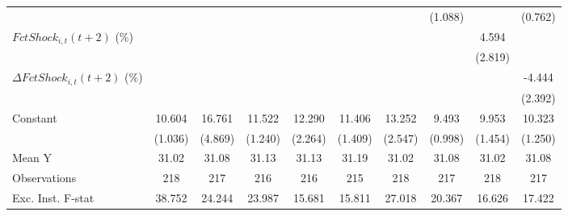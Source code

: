 {\begin{tabular}{l*{9}{c}}
                    &                     &                     &                     &                     &                     &                     &     (1.088)         &                     &     (0.762)         \\
\addlinespace
$ FctShock_{i,t}(t+2)$ (\%)&                     &                     &                     &                     &                     &                     &                     &       4.594         &                     \\
                    &                     &                     &                     &                     &                     &                     &                     &     (2.819)         &                     \\
\addlinespace
$ \Delta FctShock_{i,t}(t+2)$ (\%)&                     &                     &                     &                     &                     &                     &                     &                     &      -4.444\sym{*}  \\
                    &                     &                     &                     &                     &                     &                     &                     &                     &     (2.392)         \\
\addlinespace
Constant            &      10.604\sym{***}&      16.761\sym{***}&      11.522\sym{***}&      12.290\sym{***}&      11.406\sym{***}&      13.252\sym{***}&       9.493\sym{***}&       9.953\sym{***}&      10.323\sym{***}\\
                    &     (1.036)         &     (4.869)         &     (1.240)         &     (2.264)         &     (1.409)         &     (2.547)         &     (0.998)         &     (1.454)         &     (1.250)         \\
\midrule
Mean Y              &       31.02         &       31.08         &       31.13         &       31.13         &       31.19         &       31.02         &       31.08         &       31.02         &       31.08         \\
Observations        &         218         &         217         &         216         &         216         &         215         &         218         &         217         &         218         &         217         \\
Exc. Inst. F-stat   &      38.752         &      24.244         &      23.987         &      15.681         &      15.811         &      27.018         &      20.367         &      16.626         &      17.422         \\
\bottomrule
\end{tabular}
}
